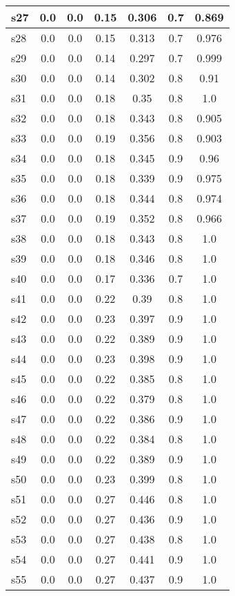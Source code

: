\documentclass{article}
\begin{document}
\begin{tabular}{|l|c|c|c|c|c|c|}
\hline
s27 &0.0 & 0.0 & 0.15 & 0.306 & 0.7 & 0.869\\
\hline
s28 &0.0 & 0.0 & 0.15 & 0.313 & 0.7 & 0.976\\
\hline
s29 &0.0 & 0.0 & 0.14 & 0.297 & 0.7 & 0.999\\
\hline
s30 &0.0 & 0.0 & 0.14 & 0.302 & 0.8 & 0.91\\
\hline
s31 &0.0 & 0.0 & 0.18 & 0.35 & 0.8 & 1.0\\
\hline
s32 &0.0 & 0.0 & 0.18 & 0.343 & 0.8 & 0.905\\
\hline
s33 &0.0 & 0.0 & 0.19 & 0.356 & 0.8 & 0.903\\
\hline
s34 &0.0 & 0.0 & 0.18 & 0.345 & 0.9 & 0.96\\
\hline
s35 &0.0 & 0.0 & 0.18 & 0.339 & 0.9 & 0.975\\
\hline
s36 &0.0 & 0.0 & 0.18 & 0.344 & 0.8 & 0.974\\
\hline
s37 &0.0 & 0.0 & 0.19 & 0.352 & 0.8 & 0.966\\
\hline
s38 &0.0 & 0.0 & 0.18 & 0.343 & 0.8 & 1.0\\
\hline
s39 &0.0 & 0.0 & 0.18 & 0.346 & 0.8 & 1.0\\
\hline
s40 &0.0 & 0.0 & 0.17 & 0.336 & 0.7 & 1.0\\
\hline
s41 &0.0 & 0.0 & 0.22 & 0.39 & 0.8 & 1.0\\
\hline
s42 &0.0 & 0.0 & 0.23 & 0.397 & 0.9 & 1.0\\
\hline
s43 &0.0 & 0.0 & 0.22 & 0.389 & 0.9 & 1.0\\
\hline
s44 &0.0 & 0.0 & 0.23 & 0.398 & 0.9 & 1.0\\
\hline
s45 &0.0 & 0.0 & 0.22 & 0.385 & 0.8 & 1.0\\
\hline
s46 &0.0 & 0.0 & 0.22 & 0.379 & 0.8 & 1.0\\
\hline
s47 &0.0 & 0.0 & 0.22 & 0.386 & 0.9 & 1.0\\
\hline
s48 &0.0 & 0.0 & 0.22 & 0.384 & 0.8 & 1.0\\
\hline
s49 &0.0 & 0.0 & 0.22 & 0.389 & 0.9 & 1.0\\
\hline
s50 &0.0 & 0.0 & 0.23 & 0.399 & 0.8 & 1.0\\
\hline
s51 &0.0 & 0.0 & 0.27 & 0.446 & 0.8 & 1.0\\
\hline
s52 &0.0 & 0.0 & 0.27 & 0.436 & 0.9 & 1.0\\
\hline
s53 &0.0 & 0.0 & 0.27 & 0.438 & 0.8 & 1.0\\
\hline
s54 &0.0 & 0.0 & 0.27 & 0.441 & 0.9 & 1.0\\
\hline
s55 &0.0 & 0.0 & 0.27 & 0.437 & 0.9 & 1.0\\

\end{tabular}
\end{document}
